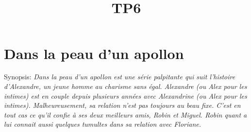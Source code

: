 \documentclass[Arial, 11pt]{article}
\begin{document}
\thispagestyle{empty}
\pagestyle{fancy}
\cfoot{-\thepage-}
\renewcommand{\headrulewidth}{.75pt}

\title{TP6}
\author{}
\date{}
\maketitle
{}
\section{Dans la peau d’un apollon}
Synopsis: \emph{
   Dans la peau d’un apollon est une série palpitante qui suit l’histoire d’Alexandre,
   un jeune homme au charisme sans égal.
   Alexandre (ou Alex pour les intimes) est en couple depuis plusieurs années avec Alexandrine
   (ou Alex pour les intimes).
   Malheureusement, sa relation n’est pas toujours au beau fixe.
   C’est en tout cas ce qu’il confie à ses deux meilleurs amis, Robin et Miguel.
   Robin quant a lui connait aussi quelques tumultes dans sa relation avec Floriane.
}
\end{document}
